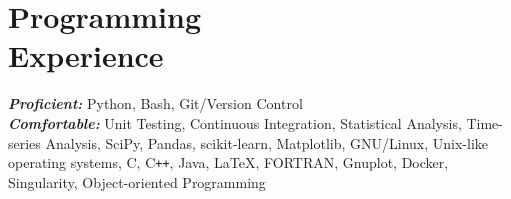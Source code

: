 \section{\mysidestyle Programming\\Experience}

\emph{\textbf{Proficient:}} Python, Bash, Git/Version Control\\
\emph{\textbf{Comfortable:}} Unit Testing, Continuous Integration, Statistical Analysis, Time-series Analysis, SciPy, Pandas, scikit-learn, Matplotlib, GNU/Linux, Unix-like operating systems, C, C\texttt{++}, Java, \LaTeX, FORTRAN, Gnuplot, Docker, Singularity, Object-oriented Programming
